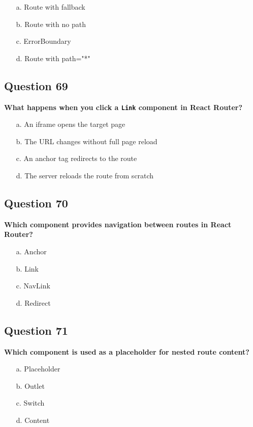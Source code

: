 \documentclass{article}
\begin{document}
\begin{itemize}
  \item[a.] Route with fallback
  \item[b.] Route with no path
  \item[c.] ErrorBoundary
  \item[d.] Route with path="*"
\end{itemize}

\subsection*{Question 69}
\textbf{What happens when you click a \texttt{Link} component in React Router?}

\begin{itemize}
  \item[a.] An iframe opens the target page
  \item[b.] The URL changes without full page reload
  \item[c.] An anchor tag redirects to the route
  \item[d.] The server reloads the route from scratch
\end{itemize}

\subsection*{Question 70}
\textbf{Which component provides navigation between routes in React Router?}

\begin{itemize}
  \item[a.] Anchor
  \item[b.] Link
  \item[c.] NavLink
  \item[d.] Redirect
\end{itemize}

\subsection*{Question 71}
\textbf{Which component is used as a placeholder for nested route content?}

\begin{itemize}
  \item[a.] Placeholder
  \item[b.] Outlet
  \item[c.] Switch
  \item[d.] Content
\end{itemize}
\end{document}
